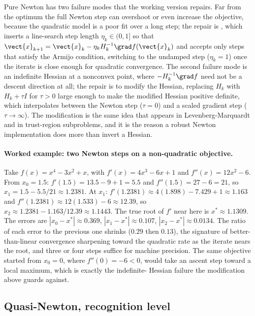 Pure Newton has two failure modes that the working version
repairs. Far from the optimum the full Newton step can overshoot
or even increase the objective, because the quadratic model is a
poor fit over a long step; the repair is ,
which inserts a line-search step length $\eta_{k} \in (0, 1]$ so
that $\vect{x}_{k+1} = \vect{x}_{k} - \eta_{k} H_{k}^{-1} \grad
f(\vect{x}_{k})$ and accepts only steps that satisfy the Armijo
condition, switching to the undamped step ($\eta_{k} = 1$) once
the iterate is close enough for quadratic convergence. The second
failure mode is an indefinite Hessian at a nonconvex point, where
$-H_{k}^{-1} \grad f$ need not be a descent direction at all; the
repair is to modify the Hessian, replacing $H_{k}$ with $H_{k} +
\tau I$ for $\tau > 0$ large enough to make the modified Hessian
positive definite, which interpolates between the Newton step
($\tau = 0$) and a scaled gradient step ($\tau \to \infty$). The
modification is the same idea that appears in Levenberg-Marquardt
and in trust-region subproblems, and it is the reason a robust
Newton implementation does more than invert a Hessian.

\paragraph{Worked example: two Newton steps on a non-quadratic
objective.}
Take $f(x) = x^{4} - 3 x^{2} + x$, with $f'(x) = 4 x^{3} - 6 x +
1$ and $f''(x) = 12 x^{2} - 6$. From $x_{0} = 1.5$: $f'(1.5) =
13.5 - 9 + 1 = 5.5$ and $f''(1.5) = 27 - 6 = 21$, so $x_{1} = 1.5
- 5.5/21 \approx 1.2381$. At $x_{1}$: $f'(1.2381) \approx 4(1.898)
- 7.429 + 1 \approx 1.163$ and $f''(1.2381) \approx 12(1.533) - 6
\approx 12.39$, so $x_{2} \approx 1.2381 - 1.163/12.39 \approx
1.1443$. The true root of $f'$ near here is $x^{*} \approx 1.1309$.
The errors are $|x_{0} - x^{*}| \approx 0.369$, $|x_{1} - x^{*}|
\approx 0.107$, $|x_{2} - x^{*}| \approx 0.0134$. The ratio of
each error to the previous one shrinks ($0.29$ then $0.13$), the
signature of better-than-linear convergence sharpening toward the
quadratic rate as the iterate nears the root, and three or four
steps suffice for machine precision. The same objective started
from $x_{0} = 0$, where $f''(0) = -6 < 0$, would take an ascent
step toward a local maximum, which is exactly the indefinite-
Hessian failure the modification above guards against.

\subsection{Quasi-Newton, recognition level}

